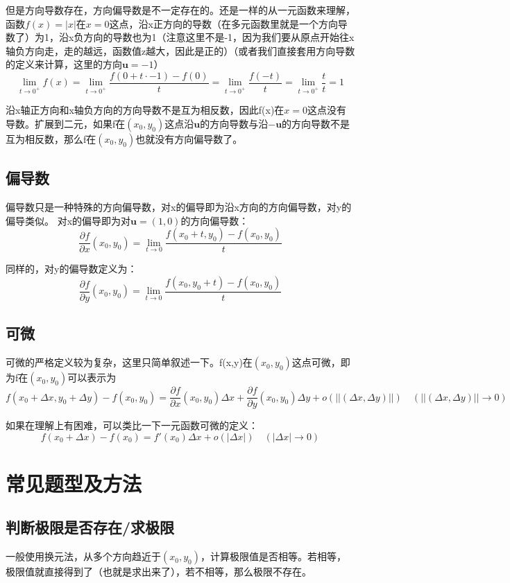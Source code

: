 \documentclass{article}
\begin{document}
但是方向导数存在，方向偏导数是不一定存在的。还是一样的从一元函数来理解，函数$f(x) = |x|$在$x=0$这点，沿x正方向的导数（在多元函数里就是一个方向导数了）为1，沿x负方向的导数也为1（注意这里不是-1，因为我们要从原点开始往x轴负方向走，走的越远，函数值z越大，因此是正的）（或者我们直接套用方向导数的定义来计算，这里的方向$\mathbf{u}=-1$）
\[\lim\limits_{t \rightarrow 0^+}f(x)=  \lim\limits_{t \rightarrow 0^+} \frac{f(0+t \cdot -1)-f(0)}{t} = 
\lim\limits_{t \rightarrow 0^+} \frac{f(-t)}{t} = \lim\limits_{t \rightarrow 0^+} \frac{t}{t}=1\]

沿x轴正方向和x轴负方向的方向导数不是互为相反数，因此f(x)在$x=0$这点没有导数。扩展到二元，如果f在$(x_0,y_0)$这点沿$\mathbf{u}$的方向导数与沿$-\mathbf{u}$的方向导数不是互为相反数，那么f在$(x_0,y_0)$也就没有方向偏导数了。


\subsection{偏导数}
偏导数只是一种特殊的方向偏导数，对x的偏导即为沿x方向的方向偏导数，对y的偏导类似。
对x的偏导即为对$\mathbf{u}=(1,0)$的方向偏导数：
\[\frac{\partial f}{\partial x}(x_0,y_0)= \lim\limits_{t \rightarrow 0}   \frac{f(x_0+t,y_0)-f(x_0,y_0)}{t}\]

同样的，对y的偏导数定义为：
\[\frac{\partial f}{\partial y}(x_0,y_0)= \lim\limits_{t \rightarrow 0}   \frac{f(x_0,y_0+t)-f(x_0,y_0)}{t}\]


\subsection{可微}
可微的严格定义较为复杂，这里只简单叙述一下。f(x,y)在$(x_0,y_0)$这点可微，即为f在$(x_0,y_0)$可以表示为
\[f(x_0+\Delta x,y_0+\Delta y)-f(x_0,y_0)= \frac{\partial f}{\partial x}(x_0,y_0)\Delta x+\frac{\partial f}{\partial y}(x_0,y_0)\Delta y+o(||(\Delta x,\Delta y)||) \quad (||(\Delta x,\Delta y)|| \rightarrow 0)\]

如果在理解上有困难，可以类比一下一元函数可微的定义：
\[f(x_0+\Delta x)-f(x_0)=f'(x_0)\Delta x+o(|\Delta x|) \quad (|\Delta x| \rightarrow 0)\]





\section{常见题型及方法}

\subsection{判断极限是否存在/求极限}
一般使用换元法，从多个方向趋近于$(x_0,y_0)$，计算极限值是否相等。若相等，极限值就直接得到了（也就是求出来了），若不相等，那么极限不存在。
\end{document}
